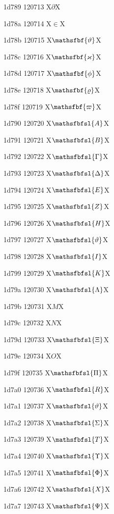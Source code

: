 \documentclass[11pt]{article}
\begin{document}
1d789 120713 X{\ensuremath{\partial}}X

1d78a 120714 X{\ensuremath{\in}}X

1d78b 120715 X{\ensuremath{\mathsfbf{\vartheta}}}X

1d78c 120716 X{\ensuremath{\mathsfbf{\varkappa}}}X

1d78d 120717 X{\ensuremath{\mathsfbf{\phi}}}X

1d78e 120718 X{\ensuremath{\mathsfbf{\varrho}}}X

1d78f 120719 X{\ensuremath{\mathsfbf{\varpi}}}X

1d790 120720 X{\ensuremath{\mathsfbfsl{A}}}X

1d791 120721 X{\ensuremath{\mathsfbfsl{B}}}X

1d792 120722 X{\ensuremath{\mathsfbfsl{\Gamma}}}X

1d793 120723 X{\ensuremath{\mathsfbfsl{\Delta}}}X

1d794 120724 X{\ensuremath{\mathsfbfsl{E}}}X

1d795 120725 X{\ensuremath{\mathsfbfsl{Z}}}X

1d796 120726 X{\ensuremath{\mathsfbfsl{H}}}X

1d797 120727 X{\ensuremath{\mathsfbfsl{\vartheta}}}X

1d798 120728 X{\ensuremath{\mathsfbfsl{I}}}X

1d799 120729 X{\ensuremath{\mathsfbfsl{K}}}X

1d79a 120730 X{\ensuremath{\mathsfbfsl{\Lambda}}}X

1d79b 120731 X{\ensuremath{M}}X

1d79c 120732 X{\ensuremath{N}}X

1d79d 120733 X{\ensuremath{\mathsfbfsl{\Xi}}}X

1d79e 120734 X{\ensuremath{O}}X

1d79f 120735 X{\ensuremath{\mathsfbfsl{\Pi}}}X

1d7a0 120736 X{\ensuremath{\mathsfbfsl{R}}}X

1d7a1 120737 X{\ensuremath{\mathsfbfsl{\vartheta}}}X

1d7a2 120738 X{\ensuremath{\mathsfbfsl{\Sigma}}}X

1d7a3 120739 X{\ensuremath{\mathsfbfsl{T}}}X

1d7a4 120740 X{\ensuremath{\mathsfbfsl{\Upsilon}}}X

1d7a5 120741 X{\ensuremath{\mathsfbfsl{\Phi}}}X

1d7a6 120742 X{\ensuremath{\mathsfbfsl{X}}}X

1d7a7 120743 X{\ensuremath{\mathsfbfsl{\Psi}}}X
\end{document}
